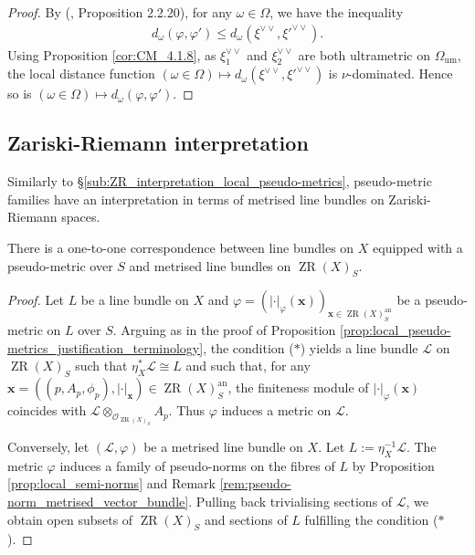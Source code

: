 \documentclass [11pt,reqno]{amsart}
\newcommand{\1}{\mathmybb{1}}
\def\cL{{\mathcal{L}}}
\def\cO{{\mathcal{O}}}
\def\an{\operatorname{an}}
\def\um{\operatorname{um}}
\def\ZR{\operatorname{ZR}}
\begin{document}
\begin{proof}
By (\cite{ChenMori}, Proposition 2.2.20), for any $\omega\in\Omega$, we have the inequality
\begin{align*}
d_{\omega}(\varphi,\varphi') \leq d_{\omega}(\xi^{\vee\vee},\xi'^{\vee\vee}).
\end{align*}
Using Proposition \ref{cor:CM_4.1.8}, as $\xi^{\vee\vee}_1$ and $\xi^{\vee\vee}_2$ are both ultrametric on $\Omega_{\um}$, the local distance function $(\omega\in\Omega)\mapsto d_{\omega}(\xi^{\vee\vee},\xi'^{\vee\vee})$ is $\nu$-dominated. Hence so is $(\omega\in\Omega)\mapsto d_{\omega}(\varphi,\varphi')$.
\end{proof}

\subsection{Zariski-Riemann interpretation}
\label{sub:ZR_interpretation_pseudo-metric}

Similarly to \S \ref{sub:ZR_interpretation_local_pseudo-metrics}, pseudo-metric families have an interpretation in terms of metrised line bundles on Zariski-Riemann spaces. 

\begin{proposition}
\label{prop:ZR_interpretation_pseudo-metric_families}
There is a one-to-one correspondence between line bundles on $X$ equipped with a pseudo-metric over $S$ and metrised line bundles on $\ZR(X)_{S}$.
\end{proposition}

\begin{proof}
Let $L$ be a line bundle on $X$ and $\varphi=(|\cdot|_{\varphi}(\mathbf{x}))_{\mathbf{x}\in\ZR(X)^{\an}_{S}}$ be a pseudo-metric on $L$ over $S$. Arguing as in the proof of Proposition \ref{prop:local_pseudo-metrics_justification_terminology}, the condition ($\ast$) yields a line bundle $\cL$ on $\ZR(X)_{S}$ such that $\eta_{X}^{\ast}\cL\cong L$ and such that, for any $\mathbf{x}=((p,A_{p},\phi_{p}),|\cdot|_{\mathbf{x}})\in\ZR(X)^{\an}_{S}$, the finiteness module of $|\cdot|_{\varphi}(\mathbf{x})$ coincides with $\cL\otimes_{\cO_{\ZR(X)_{S}}}A_{p}$. Thus $\varphi$ induces a metric on $\cL$. 

Conversely, let $(\cL,\varphi)$ be a metrised line bundle on $X$. Let $L:=\eta_{X}^{-1}\cL$. The metric $\varphi$ induces a family of pseudo-norms on the fibres of $L$ by Proposition \ref{prop:local_semi-norms} and Remark \ref{rem:pseudo-norm_metrised_vector_bundle}. Pulling back trivialising sections of $\cL$, we obtain open subsets of $\ZR(X)_{S}$ and sections of $L$ fulfilling the condition ($\ast$).
\end{proof}
\end{document}
